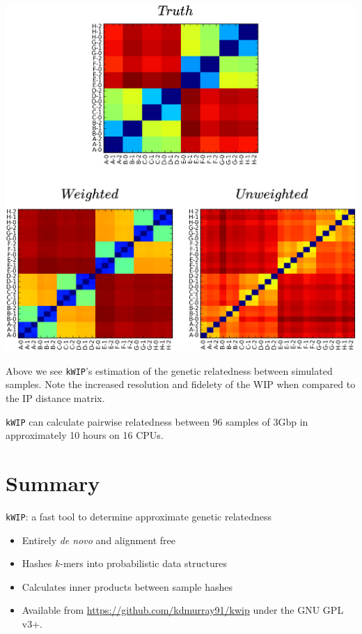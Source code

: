 \documentclass[a0,portrait]{a0poster}
\begin{document}
\begin{multicols}{2}
\begin{center}
  \includegraphics[width=30cm]{mats.png}
  \vspace{1cm}
\end{center}

Above we see \texttt{kWIP}'s estimation of the genetic relatedness between
simulated samples. Note the increased resolution and fidelety of the WIP when
compared to the IP distance matrix.

\texttt{kWIP} can calculate pairwise relatedness between 96 samples of 3Gbp in
approximately 10 hours on 16 CPUs.


\color{ForestGreen}


\section*{Summary}
\Large
\texttt{kWIP}: a fast tool to determine approximate genetic relatedness
\begin{itemize}
  \item Entirely \textit{de novo} and alignment free
  \item Hashes $k$-mers into probabilistic data structures
  \item Calculates inner products between sample hashes
  \item Available from \url{https://github.com/kdmurray91/kwip} under the GNU GPL v3+.
\end{itemize}


\end{multicols}
\end{document}
